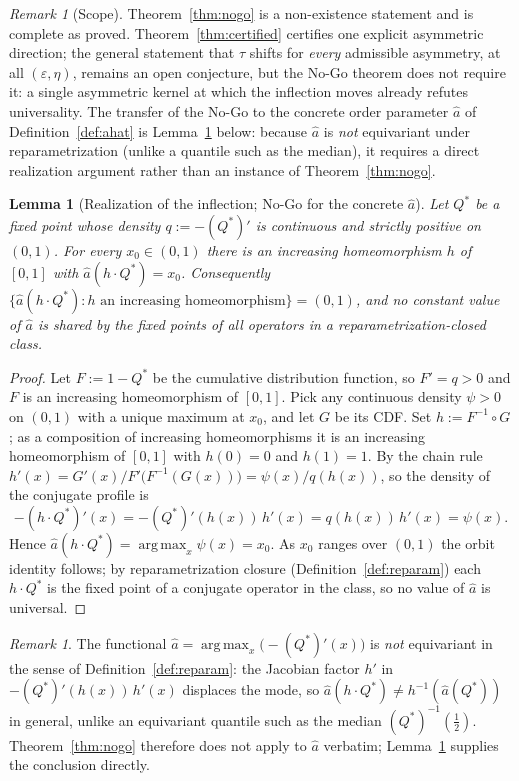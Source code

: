 \documentclass[11pt]{article}
\theoremstyle{plain}
\newtheorem{lemma}[theorem]{Lemma}
\theoremstyle{definition}
\theoremstyle{remark}
\newtheorem{remark}[theorem]{Remark}
\DeclareMathOperator*{\argmax}{arg\,max}
\begin{document}
\begin{remark}[Scope]
Theorem~\ref{thm:nogo} is a non-existence statement and is complete as proved. Theorem~\ref{thm:certified} certifies one explicit asymmetric direction; the general statement that $\tau$ shifts for \emph{every} admissible asymmetry, at all $(\varepsilon,\eta)$, remains an open conjecture, but the No-Go theorem does not require it: a single asymmetric kernel at which the inflection moves already refutes universality. The transfer of the No-Go to the concrete order parameter $\hat a$ of Definition~\ref{def:ahat} is Lemma~\ref{lem:realization} below: because $\hat a$ is \emph{not} equivariant under reparametrization (unlike a quantile such as the median), it requires a direct realization argument rather than an instance of Theorem~\ref{thm:nogo}.
\end{remark}

\begin{lemma}[Realization of the inflection; No-Go for the concrete $\hat a$]\label{lem:realization}
Let $Q^*$ be a fixed point whose density $q:=-(Q^*)'$ is continuous and strictly positive on $(0,1)$. For every $x_0\in(0,1)$ there is an increasing homeomorphism $h$ of $[0,1]$ with $\hat a(h\cdot Q^*)=x_0$. Consequently $\{\hat a(h\cdot Q^*):h\text{ an increasing homeomorphism}\}=(0,1)$, and no constant value of $\hat a$ is shared by the fixed points of all operators in a reparametrization-closed class.
\end{lemma}
\begin{proof}
Let $F:=1-Q^*$ be the cumulative distribution function, so $F'=q>0$ and $F$ is an increasing homeomorphism of $[0,1]$. Pick any continuous density $\psi>0$ on $(0,1)$ with a unique maximum at $x_0$, and let $G$ be its CDF. Set $h:=F^{-1}\circ G$; as a composition of increasing homeomorphisms it is an increasing homeomorphism of $[0,1]$ with $h(0)=0$ and $h(1)=1$. By the chain rule $h'(x)=G'(x)/F'\big(F^{-1}(G(x))\big)=\psi(x)/q(h(x))$, so the density of the conjugate profile is
\[
-(h\cdot Q^*)'(x)=-(Q^*)'(h(x))\,h'(x)=q(h(x))\,h'(x)=\psi(x).
\]
Hence $\hat a(h\cdot Q^*)=\argmax_{x}\psi(x)=x_0$. As $x_0$ ranges over $(0,1)$ the orbit identity follows; by reparametrization closure (Definition~\ref{def:reparam}) each $h\cdot Q^*$ is the fixed point of a conjugate operator in the class, so no value of $\hat a$ is universal.
\end{proof}
\begin{remark}
The functional $\hat a=\argmax_x\big(-(Q^*)'(x)\big)$ is \emph{not} equivariant in the sense of Definition~\ref{def:reparam}: the Jacobian factor $h'$ in $-(Q^*)'(h(x))\,h'(x)$ displaces the mode, so $\hat a(h\cdot Q^*)\neq h^{-1}(\hat a(Q^*))$ in general, unlike an equivariant quantile such as the median $(Q^*)^{-1}(\tfrac12)$. Theorem~\ref{thm:nogo} therefore does not apply to $\hat a$ verbatim; Lemma~\ref{lem:realization} supplies the conclusion directly.
\end{remark}
\end{document}
